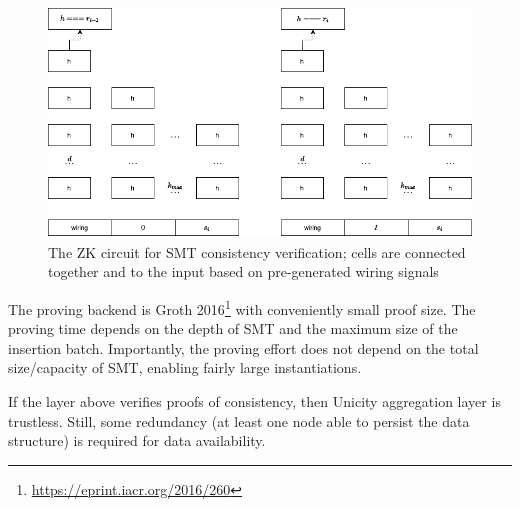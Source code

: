 \documentclass{article}
\begin{document}
\begin{figure}[htb]
    \centering
    \includegraphics[width=\textwidth]{smt-circuit.drawio}
    \caption{The ZK circuit for SMT consistency verification; cells are connected together and to the input based on pre-generated wiring signals}
    \label{fig:zk-circuit}
\end{figure}

The proving backend is Groth 2016\footnote{\url{https://eprint.iacr.org/2016/260}} with conveniently small proof size. The proving time depends on the depth of SMT and the maximum size of the insertion batch. Importantly, the proving effort does not depend on the total size/capacity of SMT, enabling fairly large instantiations.

If the layer above verifies proofs of consistency, then Unicity aggregation layer is trustless. Still, some redundancy (at least one node able to persist the data structure) is required for data availability.
\end{document}
